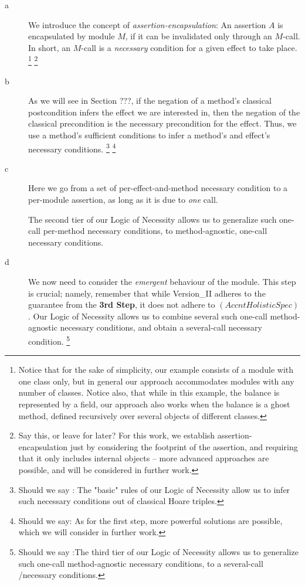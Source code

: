 \begin{description}
\item[a] We introduce the concept of \emph{assertion-encapsulation}: An assertion $A$  is
encapsulated by  module $M$, if it can be invalidated only through
    an $M$-\internalC call. 
  In short, an $M$-\internalC call is a \emph{necessary} condition for
a given effect to take place.
\footnote{Notice that for the sake of simplicity, our example consists of a module with one class only, but 
    in general our approach accommodates modules with any number of classes.
     Notice also, that while in this example, the balance is 
represented by a field, our approach also works when the balance is a ghost method, defined 
recursively over several objects of different classes.}
\footnote{Say this, or  leave for later? For this work, we establish assertion-encapsulation just by considering the 
footprint of the assertion, and requiring that it only includes internal objects --
more advanced approaches are possible, and will be considered in further work.}


\item[b]  
 As we will see in Section ???, 
if the negation of a method's
 classical postcondition infers  the effect we are interested in, then the negation of the 
 classical precondition  is the necessary precondition for the effect. Thus, 
we use a method's sufficient conditions to infer a method's and effect's necessary conditions.
\footnote{Should we say :
  The "basic" rules of our Logic of Necessity allow us to infer such necessary conditions out of classical Hoare triples. }
\footnote{Should we say: As for the first step, more powerful solutions are possible, which we will consider  in further work. }

\item[c]  Here we go from a set
of per-effect-and-method necessary  condition to a per-module assertion, as long as it is due to 
\emph{one} \internalC call.

The second tier of our Logic of Necessity allows us to generalize  such one-call per-method necessary conditions, to   method-agnostic, one-call necessary conditions.

\item[d] 
We now need to consider the \emph{emergent} behaviour of the module.  This step is crucial; namely, remember that while Version\_II adheres to
the guarantee from the \textbf{3rd Step}, it does not adhere to  $(AccntHolisticSpec)$.   
Our Logic of Necessity allows us to combine  several such one-call method-agnostic necessary conditions, and obtain a several-call   necessary condition.
\footnote{Should we say :The third tier of our Logic of Necessity allows us to generalize  such one-call method-agnostic necessary conditions, to a several-call \internalC/\externalC necessary conditions.}

\end{description} 
